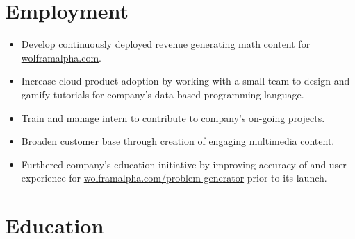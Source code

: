 \documentclass[11pt,a4paper,unicode]{moderncv}
\begin{document}
\vspace*{-4mm}
\maketitle
\vspace*{-3mm}

\section{Employment}

\cvline{}
{\begin{itemize} 
	\item Develop continuously deployed revenue generating math content for \url{wolframalpha.com}. 
	 \item Increase cloud product adoption by working with a small team to design and gamify tutorials for company's data-based programming language. 
	 \item Train and manage intern to contribute to company's on-going projects.
	 \item Broaden customer base through creation of engaging multimedia content.
	  \item Furthered company's education initiative by improving accuracy of and user experience for \url{wolframalpha.com/problem-generator} prior to its launch.
 \end{itemize}}
	 
\vspace{-.5cm}




\section{Education}

\end{document}
